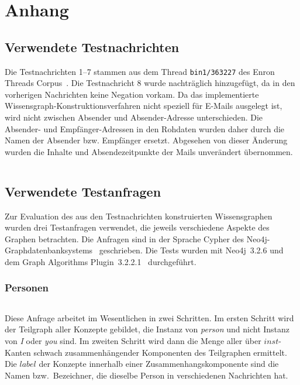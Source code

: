 
\chapter{Anhang}%
\label{sec:appendix}

\section{Verwendete Testnachrichten}%
\label{sec:appendix:msgs}

Die Testnachrichten 1--7 stammen aus dem Thread \texttt{bin1/363227} des Enron Threads Corpus~\cite{EnronThreads}.
Die Testnachricht 8 wurde nachträglich hinzugefügt, da in den vorherigen Nachrichten keine Negation vorkam.
Da das implementierte Wissensgraph-Konstruktionsverfahren nicht speziell für E-Mails ausgelegt ist, wird nicht zwischen Absender und Absender-Adresse unterschieden.
Die Absender- und Empfänger-Adressen in den Rohdaten wurden daher durch die Namen der Absender bzw. Empfänger ersetzt.
Abgesehen von dieser Änderung wurden die Inhalte und Absendezeitpunkte der Mails unverändert übernommen.
\inputminted{clojure}{data/evaluation/testdata.clj}

\section{Verwendete Testanfragen}%
\label{sec:appendix:queries}

Zur Evaluation des aus den Testnachrichten konstruierten Wissensgraphen wurden drei Testanfragen verwendet, die jeweils verschiedene Aspekte des Graphen betrachten.
Die Anfragen sind in der Sprache Cypher des Neo4j-Graphdatenbanksystems~\cite{Neo4j} geschrieben.
Die Tests wurden mit Neo4j~3.2.6 und dem Graph Algorithms Plugin~3.2.2.1~\cite{GraphAlgo} durchgeführt.

\subsection{Personen}%
\label{sec:appendix:queries:people}

\inputminted{cypher}{data/evaluation/people.cql}
Diese Anfrage arbeitet im Wesentlichen in zwei Schritten.
Im ersten Schritt wird der Teilgraph aller Konzepte gebildet, die Instanz von \textit{person} und nicht Instanz von \textit{I} oder \textit{you} sind.
Im zweiten Schritt wird dann die Menge aller über $inst$-Kanten schwach zusammenhängender Komponenten des Teilgraphen ermittelt.
Die $label$ der Konzepte innerhalb einer Zusammenhangskomponente sind die Namen bzw.\ Bezeichner, die dieselbe Person in verschiedenen Nachrichten hat.

